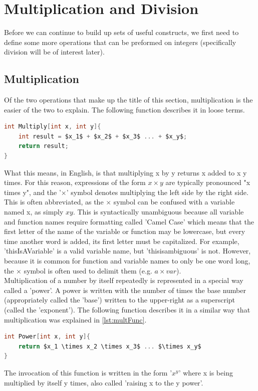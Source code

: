 \section{Multiplication and Division}
Before we can continue to build up sets of useful constructs, we first need to define some more operations that can be preformed on integers (specifically division will be of interest later). \\

\subsection{Multiplication}
Of the two operations that make up the title of this section, multiplication is the easier of the two to explain. The following function describes it in loose terms.
\begin{center}
\begin{lstlisting}[language=C,caption=Multiplication Function,label=lst:multFunc,mathescape]
int Multiply[int x, int y]{
	int result = $x_1$ + $x_2$ + $x_3$ ... + $x_y$;
	return result;
}
\end{lstlisting}
\end{center}

What this means, in English, is that multiplying x by y returns x added to x y times. For this reason, expressions of the form $x\times y$ are typically pronounced "x times y", and the '$\times$' symbol denotes multiplying the left side by the right side. This is often abbreviated, as the $\times$ symbol can be confused with a variable named x, as simply $xy$. This is syntactically unambiguous because all variable and function names require formatting called 'Camel Case' which means that the first letter of the name of the variable or function may be lowercase, but every time another word is added, its first letter must be capitalized. For example, 'thisIsAVariable' is a valid variable name, but 'thisisambiguous' is not. However, because it is common for function and variable names to only be one word long, the $\times$ symbol is often used to delimit them (e.g. $a\times var$). \\
Multiplication of a number by itself repeatedly is represented in a special way called a 'power'. A power is written with the number of times the base number (appropriately called the 'base') written to the upper-right as a superscript (called the 'exponent'). The following function describes it in a similar way that multiplication was explained in \ref{lst:multFunc}.
\begin{center}
\begin{lstlisting}[language=C,caption=Power Function,label=lst:powFunc,mathescape]
int Power[int x, int y]{
	return $x_1 \times x_2 \times x_3$ ... $\times x_y$
}
\end{lstlisting}
\end{center}
The invocation of this function is written in the form '$x^y$' where x is being multiplied by itself y times, also called 'raising x to the y power'.

